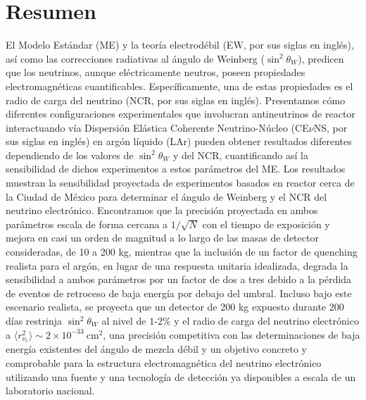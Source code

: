 \chapter*{Resumen}

El Modelo Estándar (ME) y la teoría electrodébil (EW, por sus siglas en inglés), así como las correcciones radiativas al ángulo de Weinberg ($\sin^2\theta_W$), predicen que los neutrinos, aunque eléctricamente neutros, poseen propiedades electromagnéticas cuantificables. Específicamente, una de estas propiedades es el radio de carga del neutrino (NCR, por sus siglas en inglés). Presentamos cómo diferentes configuraciones experimentales que involucran antineutrinos de reactor interactuando vía Dispersión Elástica Coherente Neutrino-Núcleo (CE$\nu$NS, por sus siglas en inglés) en argón líquido (LAr) pueden obtener resultados diferentes dependiendo de los valores de $\sin^2\theta_W$ y del NCR, cuantificando así la sensibilidad de dichos experimentos a estos parámetros del ME. Los resultados muestran la sensibilidad proyectada de experimentos basados en reactor cerca de la Ciudad de México para determinar el ángulo de Weinberg y el NCR del neutrino electrónico. Encontramos que la precisión proyectada en ambos parámetros escala de forma cercana a $1/\sqrt{N}$ con el tiempo de exposición y mejora en casi un orden de magnitud a lo largo de las masas de detector consideradas, de 10 a 200 kg, mientras que la inclusión de un factor de quenching realista para el argón, en lugar de una respuesta unitaria idealizada, degrada la sensibilidad a ambos parámetros por un factor de dos a tres debido a la pérdida de eventos de retroceso de baja energía por debajo del umbral. Incluso bajo este escenario realista, se proyecta que un detector de 200 kg expuesto durante 200 días restrinja $\sin^2\theta_W$ al nivel de $1$-$2\%$ y el radio de carga del neutrino electrónico a $\langle r_{\nu_e}^2\rangle \sim 2\times10^{-33}\ \text{cm}^2$, una precisión competitiva con las determinaciones de baja energía existentes del ángulo de mezcla débil y un objetivo concreto y comprobable para la estructura electromagnética del neutrino electrónico utilizando una fuente y una tecnología de detección ya disponibles a escala de un laboratorio nacional.
